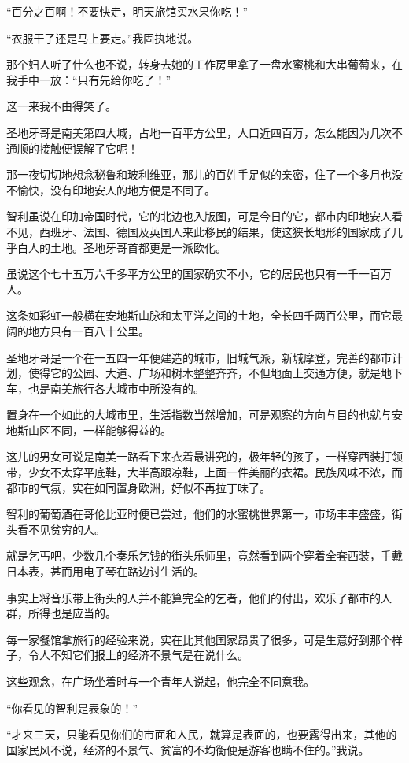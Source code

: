 \par “百分之百啊！不要快走，明天旅馆买水果你吃！”
\par “衣服干了还是马上要走。”我固执地说。
\par 那个妇人听了什么也不说，转身去她的工作房里拿了一盘水蜜桃和大串葡萄来，在我手中一放：“只有先给你吃了！”
\par 这一来我不由得笑了。
\par 圣地牙哥是南美第四大城，占地一百平方公里，人口近四百万，怎么能因为几次不通顺的接触便误解了它呢！
\par 那一夜切切地想念秘鲁和玻利维亚，那儿的百姓手足似的亲密，住了一个多月也没不愉快，没有印地安人的地方便是不同了。
\par 智利虽说在印加帝国时代，它的北边也入版图，可是今日的它，都市内印地安人看不见，西班牙、法国、德国及英国人来此移民的结果，使这狭长地形的国家成了几乎白人的土地。圣地牙哥首都更是一派欧化。
\par 虽说这个七十五万六千多平方公里的国家确实不小，它的居民也只有一千一百万人。
\par 这条如彩虹一般横在安地斯山脉和太平洋之间的土地，全长四千两百公里，而它最阔的地方只有一百八十公里。
\par 圣地牙哥是一个在一五四一年便建造的城市，旧城气派，新城摩登，完善的都市计划，使得它的公园、大道、广场和树木整整齐齐，不但地面上交通方便，就是地下车，也是南美旅行各大城市中所没有的。
\par 置身在一个如此的大城市里，生活指数当然增加，可是观察的方向与目的也就与安地斯山区不同，一样能够得益的。
\par 这儿的男女可说是南美一路看下来衣着最讲究的，极年轻的孩子，一样穿西装打领带，少女不太穿平底鞋，大半高跟凉鞋，上面一件美丽的衣裙。民族风味不浓，而都市的气氛，实在如同置身欧洲，好似不再拉丁味了。
\par 智利的葡萄酒在哥伦比亚时便已尝过，他们的水蜜桃世界第一，市场丰丰盛盛，街头看不见贫穷的人。
\par 就是乞丐吧，少数几个奏乐乞钱的街头乐师里，竟然看到两个穿着全套西装，手戴日本表，甚而用电子琴在路边讨生活的。
\par 事实上将音乐带上街头的人并不能算完全的乞者，他们的付出，欢乐了都市的人群，所得也是应当的。
\par 每一家餐馆拿旅行的经验来说，实在比其他国家昂贵了很多，可是生意好到那个样子，令人不知它们报上的经济不景气是在说什么。
\par 这些观念，在广场坐着时与一个青年人说起，他完全不同意我。
\par “你看见的智利是表象的！”
\par “才来三天，只能看见你们的市面和人民，就算是表面的，也要露得出来，其他的国家民风不说，经济的不景气、贫富的不均衡便是游客也瞒不住的。”我说。
